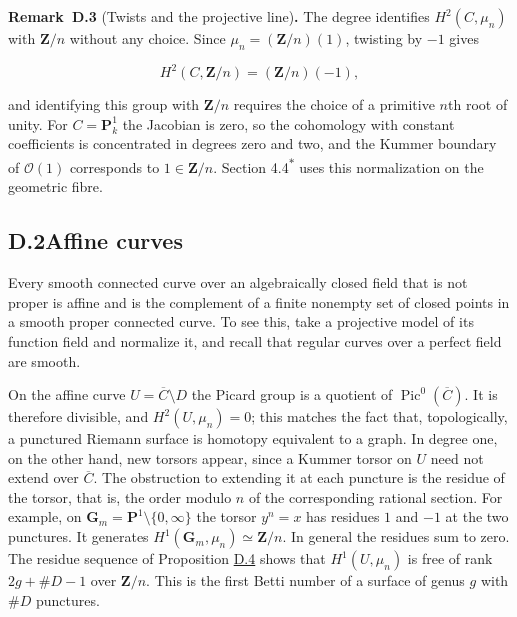 \documentclass[11pt]{article}
\newenvironment{bpstatement}[2]{\par\addvspace{0.6\baselineskip}\noindent\textbf{#1}#2\textbf{.}\enspace\ignorespaces}
  {\par\addvspace{0.4\baselineskip}}
\newcommand{\bpout}[1]{#1\textsuperscript{\hyperlink{bp-outside}{\ensuremath{\ast}}}}
\begin{document}
\label{bp10}%
\begin{bpstatement}{Remark~D.3}{ (Twists and the projective line)}
The degree identifies \(H^2(C,\mu_n)\) with \(\mathbf Z/n\) without any choice. Since \(\mu_n=(\mathbf Z/n)(1)\), twisting by \(-1\) gives

\[
H^2(C,\mathbf Z/n)=(\mathbf Z/n)(-1),
\]

and identifying this group with \(\mathbf Z/n\) requires the choice of a primitive \(n\)th root of unity.  For \(C=\mathbf P^1_k\) the Jacobian is zero, so the cohomology with constant coefficients is concentrated in degrees zero and two, and the Kummer boundary of \(\mathcal O(1)\) corresponds to \(1\in\mathbf Z/n\). Section \bpout{4.4} uses this normalization on the geometric fibre.
\end{bpstatement}


\subsection*{\texorpdfstring{D.2\quad Affine curves}{D.2 Affine curves}}
\label{bp11}%
\label{bp12}%
Every smooth connected curve over an algebraically closed field that is not proper is affine and is the complement of a finite nonempty set of closed points in a smooth proper connected curve.  To see this, take a projective model of its function field and normalize it, and recall that regular curves over a perfect field are smooth.

On the affine curve \(U=\overline C\setminus D\) the Picard group is a quotient of \(\operatorname{Pic}^0(\overline C)\). It is therefore divisible, and \(H^2(U,\mu_n)=0\); this matches the fact that, topologically, a punctured Riemann surface is homotopy equivalent to a graph. In degree one, on the other hand, new torsors appear, since a Kummer torsor on \(U\) need not extend over \(\overline C\). The obstruction to extending it at each puncture is the residue of the torsor, that is, the order modulo \(n\) of the corresponding rational section. For example, on \(\mathbf G_m=\mathbf P^1\setminus\{0,\infty\}\) the torsor \(y^n=x\) has residues \(1\) and \(-1\) at the two punctures. It generates \(H^1(\mathbf G_m,\mu_n)\simeq\mathbf Z/n\). In general the residues sum to zero. The residue sequence of Proposition \hyperref[bp13]{D.4} shows that \(H^1(U,\mu_n)\) is free of rank \(2g+\#D-1\) over \(\mathbf Z/n\). This is the first Betti number of a surface of genus \(g\) with \(\#D\) punctures.
\end{document}

